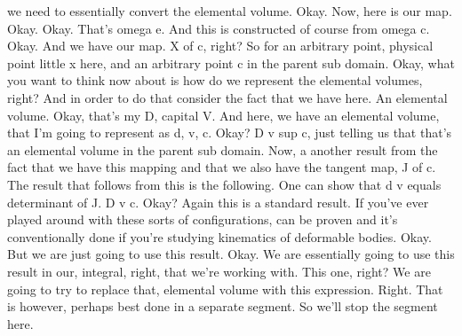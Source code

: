 \documentclass[10pt]{article}
\begin{document}
we need to essentially convert the elemental volume. Okay. Now, here is our map. Okay. Okay. That's omega e. And this is constructed of course from omega c. Okay. And we have our map. X of c, right? So for an arbitrary point, physical point little x here, and an arbitrary point c in the parent sub domain. Okay, what you want to think now about is how do we represent the elemental volumes, right? And in order to do that consider the fact that we have here. An elemental volume. Okay, that's my D, capital V. And here, we have an elemental volume, that I'm going to represent as d, v, c. Okay? D v sup c, just telling us that that's an elemental volume in the parent sub domain. Now, a another result from the fact that we have this mapping and that we also have the tangent map, J of c. The result that follows from this is the following. One can show that d v equals determinant of J. D v c. Okay? Again this is a standard result. If you've ever played around with these sorts of configurations, can be proven and it's conventionally done if you're studying kinematics of deformable bodies. Okay. But we are just going to use this result. Okay. We are essentially going to use this result in our, integral, right, that we're working with. This one, right? We are going to try to replace that, elemental volume with this expression. Right. That is however, perhaps best done in a separate segment. So we'll stop the segment here.
\end{document}
